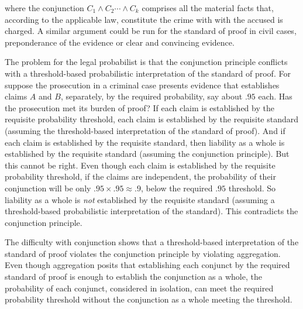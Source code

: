 \documentclass[
  10pt,
  dvipsnames,enabledeprecatedfontcommands]{scrartcl}
\newcommand{\et}{\wedge}
\begin{document}
\noindent where the conjunction \(C_1 \et C_2 \cdots \et C_k\) comprises
all the material facts that, according to the applicable law, constitute
the crime with with the accused is charged. A similar argument could be
run for the standard of proof in civil cases, preponderance of the
evidence or clear and convincing evidence.

The problem for the legal probabilist is that the conjunction principle
conflicts with a threshold-based probabilistic interpretation of the
standard of proof. For suppose the prosecution in a criminal case
presents evidence that establishes claims \(A\) and \(B\), separately,
by the required probability, say about \(.95\) each. Has the prosecution
met its burden of proof? If each claim is established by the requisite
probability threshold, each claim is established by the requisite
standard (assuming the threshold-based interpretation of the standard of
proof). And if each claim is established by the requisite standard, then
liability as a whole is established by the requisite standard (assuming
the conjunction principle). But this cannot be right. Even though each
claim is established by the requisite probability threshold, if the
claims are independent, the probability of their conjunction will be
only \(.95\times .95 \approx .9\), below the required \(.95\) threshold.
So liability as a whole is \textit{not} established by the requisite
standard (assuming a threshold-based probabilistic interpretation of the
standard). This contradicts the conjunction principle.

The difficulty with conjunction shows that a threshold-based
interpretation of the standard of proof violates the conjunction
principle by violating aggregation. Even though aggregation posits that
establishing each conjunct by the required standard of proof is enough
to establish the conjunction as a whole, the probability of each
conjunct, considered in isolation, can meet the required probability
threshold without the conjunction as a whole meeting the threshold.
\end{document}
